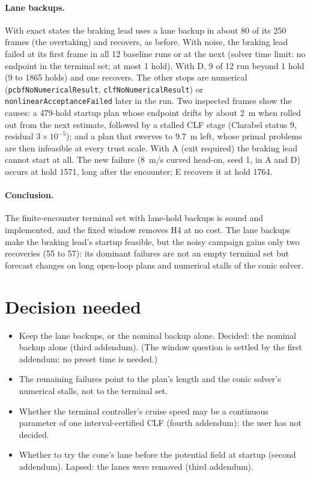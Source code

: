 \documentclass[11pt]{article}
\begin{document}
\paragraph{Lane backups.} With exact states the braking lead uses a lane
backup in about 80 of its 250 frames (the overtaking) and recovers, as
before. With noise, the braking lead failed at its first frame in all 12
baseline runs or at the next (solver time limit: no endpoint in the terminal
set; at most 1 hold). With D, 9 of 12 run beyond 1 hold (9 to 1865 holds) and
one recovers. The
other stops are numerical (\texttt{pcbfNoNumericalResult},
\texttt{clfNoNumericalResult}) or \texttt{nonlinearAcceptanceFailed} later in
the run. Two inspected frames show the causes: a 479-hold startup plan whose
endpoint drifts by about 2~m when rolled out from the next estimate, followed
by a stalled CLF stage (Clarabel status 9, residual $3\times10^{-5}$); and a
plan that swerves to 9.7~m left, whose primal problems are then infeasible at
every trust scale. With A (exit required) the braking lead cannot start at
all. The new failure (8~m/s curved head-on, seed 1, in A and D) occurs at hold
1571, long after the encounter; E recovers it at hold 1764.

\paragraph{Conclusion.} The finite-encounter terminal set with lane-hold
backups is sound and implemented, and the fixed window removes H4 at no cost.
The lane backups make the braking lead's startup feasible, but the noisy
campaign gains only two recoveries (55 to 57): its dominant failures are not
an empty terminal set but forecast changes on long open-loop plans and
numerical stalls of the conic solver.

\section{Decision needed}
\begin{itemize}
\item Keep the lane backups, or the nominal backup alone. Decided: the
  nominal backup alone (third addendum). (The window question is settled by
  the first addendum: no preset time is needed.)
\item The remaining failures point to the plan's length and the conic
  solver's numerical stalls, not to the terminal set.
\item Whether the terminal controller's cruise speed may be a continuous
  parameter of one interval-certified CLF (fourth addendum); the user has
  not decided.
\item Whether to try the cone's lane before the potential field at startup
  (second addendum). Lapsed: the lanes were removed (third addendum).
\end{itemize}
\end{document}
